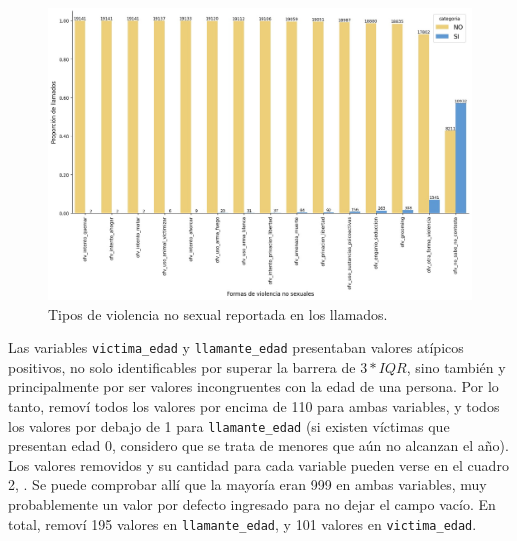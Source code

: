 \documentclass[10 pt]{article}
\begin{document}
\begin{figure}[H]
\begin{center}
\includegraphics[scale=.5]{images/latex_ofv_sino.jpeg}
\caption{Tipos de violencia no sexual reportada en los llamados.}
\label{ofvsino}
\end{center}
\end{figure} 



Las variables \texttt{victima\_edad} y \texttt{llamante\_edad} presentaban valores atípicos positivos, no solo identificables por superar la barrera de \(3*IQR\), sino también y principalmente por ser valores incongruentes con la edad de una persona. Por lo tanto, removí todos los valores por encima de 110 para ambas variables, y todos los valores por debajo de 1 para \texttt{llamante\_edad} (si existen víctimas que presentan edad 0, considero que se trata de menores que aún no alcanzan el año). Los valores removidos y su cantidad para cada variable pueden verse en el cuadro 2, . Se puede comprobar allí que la mayoría eran 999 en ambas variables, muy probablemente un valor por defecto ingresado para no dejar el campo vacío. En total, removí 195 valores en \texttt{llamante\_edad}, y 101 valores en \texttt{victima\_edad}. 
\end{document}
